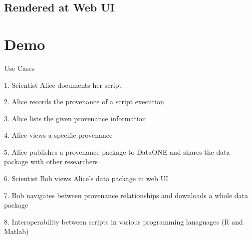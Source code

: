 \documentclass[runningheads,a4paper]{llncs}
\begin{document}
{%




\subsection{Rendered at Web UI}


\section{Demo}   \label{demo}

Use Cases

1. Scientist Alice documents her script

2. Alice records the provenance of a script execution

3. Alice lists the given provenance information

4. Alice views a specific provenance

5. Alice publishes a provenance package to DataONE and shares the data package with other researchers


6. Scientist Bob views Alice's data package in web UI

7. Bob navigates between provenance relationships and downloads a whole data package

8. Interoperability between scripts in various programming lanaguages (R and Matlab)

}
\end{document}

